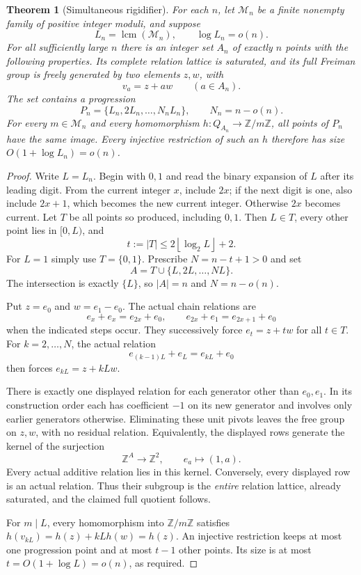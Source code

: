 \documentclass[11pt]{article}
\newtheorem{theorem}{Theorem}[section]
\theoremstyle{definition}
\theoremstyle{remark}
\newcommand{\Z}{\mathbb Z}
\newcommand{\floor}[1]{\left\lfloor #1\right\rfloor}
\begin{document}
\begin{theorem}[Simultaneous rigidifier]\label{thm:rigidifier}
For each $n$, let $\mathcal M_n$ be a finite nonempty family of positive
integer moduli, and suppose
\[
L_n=\operatorname{lcm}(\mathcal M_n),\qquad \log L_n=o(n).
\]
For all sufficiently large $n$ there is an integer set $A_n$ of
\emph{exactly} $n$ points with the following properties.
Its complete relation lattice is saturated, and its full Freiman group
is freely generated by two elements $z,w$, with
\[
v_a=z+aw\qquad(a\in A_n).
\]
The set contains a progression
\[
P_n=\{L_n,2L_n,\ldots,N_nL_n\},\qquad N_n=n-o(n).
\]
For every $m\in\mathcal M_n$ and every homomorphism
$h:Q_{A_n}\to\Z/m\Z$, all points of $P_n$ have the same image.
Every injective restriction of such an $h$ therefore has size
$O(1+\log L_n)=o(n)$.
\end{theorem}
\begin{proof}
Write $L=L_n$. Begin with $0,1$ and read the binary expansion of $L$
after its leading digit. From the current integer $x$, include $2x$;
if the next digit is one, also include $2x+1$, which becomes the new
current integer. Otherwise $2x$ becomes current. Let $T$ be all points
so produced, including $0,1$. Then $L\in T$, every other point lies
in $[0,L)$, and
\[
t:=|T|\le2\floor{\log_2 L}+2.
\]
For $L=1$ simply use $T=\{0,1\}$. Prescribe
$N=n-t+1>0$ and set
\[
A=T\cup\{L,2L,\ldots,NL\}.
\]
The intersection is exactly $\{L\}$, so $|A|=n$ and
$N=n-o(n)$.

Put $z=e_0$ and $w=e_1-e_0$. The actual chain relations are
\[
e_x+e_x=e_{2x}+e_0,
\qquad e_{2x}+e_1=e_{2x+1}+e_0
\]
when the indicated steps occur. They successively force
$e_t=z+tw$ for all $t\in T$. For $k=2,\ldots,N$, the actual relation
\[
e_{(k-1)L}+e_L=e_{kL}+e_0
\]
then forces $e_{kL}=z+kLw$.

There is exactly one displayed relation for each generator other than
$e_0,e_1$. In its construction order each has coefficient $-1$ on its
new generator and involves only earlier generators otherwise.
Eliminating these unit pivots leaves the free group on $z,w$, with no
residual relation. Equivalently, the displayed rows generate the
kernel of the surjection
\[
\Z^A\longrightarrow\Z^2,\qquad e_a\longmapsto(1,a).
\]
Every actual additive relation lies in this kernel. Conversely, every
displayed row is an actual relation. Thus their subgroup is the
\emph{entire} relation lattice, already saturated, and the claimed
full quotient follows.

For $m\mid L$, every homomorphism into $\Z/m\Z$ satisfies
$h(v_{kL})=h(z)+kLh(w)=h(z)$. An injective restriction keeps at most
one progression point and at most $t-1$ other points. Its size is at
most $t=O(1+\log L)=o(n)$, as required.
\end{proof}
\end{document}
